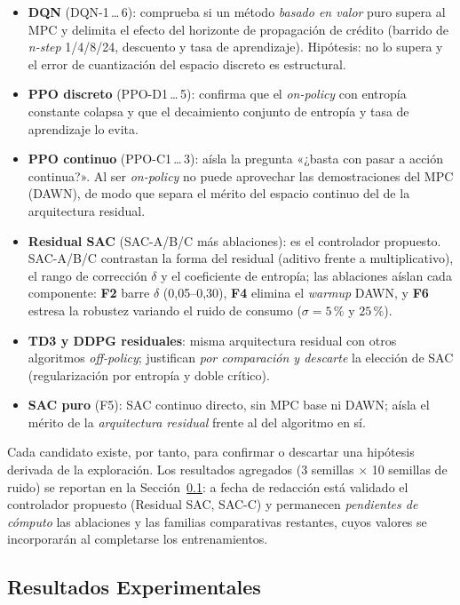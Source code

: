 \documentclass[12pt, a4paper, twoside]{report}
\begin{document}
\begin{itemize}
  \item \textbf{DQN} (DQN-1\,\ldots\,6): comprueba si un método \emph{basado en valor}
    puro supera al MPC y delimita el efecto del horizonte de propagación de crédito
    (barrido de \textit{n-step} 1/4/8/24, descuento y tasa de aprendizaje). Hipótesis:
    no lo supera y el error de cuantización del espacio discreto es estructural.
  \item \textbf{PPO discreto} (PPO-D1\,\ldots\,5): confirma que el \textit{on-policy}
    con entropía constante colapsa y que el decaimiento conjunto de entropía y tasa
    de aprendizaje lo evita.
  \item \textbf{PPO continuo} (PPO-C1\,\ldots\,3): aísla la pregunta «¿basta con pasar
    a acción continua?». Al ser \textit{on-policy} no puede aprovechar las
    demostraciones del MPC (DAWN), de modo que separa el mérito del espacio continuo
    del de la arquitectura residual.
  \item \textbf{Residual SAC} (SAC-A/B/C más ablaciones): es el controlador propuesto.
    SAC-A/B/C contrastan la forma del residual (aditivo frente a multiplicativo), el
    rango de corrección $\delta$ y el coeficiente de entropía; las ablaciones aíslan
    cada componente: \textbf{F2} barre $\delta$ (0,05--0,30), \textbf{F4} elimina el
    \textit{warmup} DAWN, y \textbf{F6} estresa la robustez variando el ruido de
    consumo ($\sigma=5\,\%$ y $25\,\%$).
  \item \textbf{TD3 y DDPG residuales}: misma arquitectura residual con otros
    algoritmos \textit{off-policy}; justifican \emph{por comparación y descarte} la
    elección de SAC (regularización por entropía y doble crítico).
  \item \textbf{SAC puro} (F5): SAC continuo directo, sin MPC base ni DAWN; aísla el
    mérito de la \emph{arquitectura residual} frente al del algoritmo en sí.
\end{itemize}

Cada candidato existe, por tanto, para confirmar o descartar una hipótesis derivada
de la exploración. Los resultados agregados (3 semillas $\times$ 10 semillas de
ruido) se reportan en la Sección~\ref{sub:resultados}: a fecha de redacción está
validado el controlador propuesto (Residual SAC, SAC-C) y permanecen
\textit{pendientes de cómputo} las ablaciones y las familias comparativas restantes,
cuyos valores se incorporarán al completarse los entrenamientos.

\subsection{Resultados Experimentales}
\label{sub:resultados}
\end{document}
